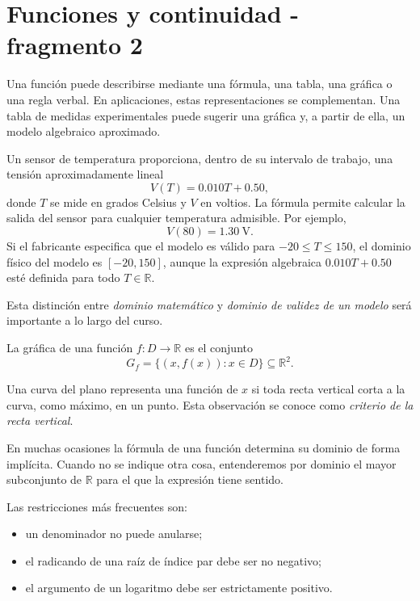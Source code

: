 \section{Funciones y continuidad - fragmento 2}
Una función puede describirse mediante una fórmula, una tabla, una gráfica o una regla verbal. En aplicaciones, estas representaciones se complementan. Una tabla de medidas experimentales puede sugerir una gráfica y, a partir de ella, un modelo algebraico aproximado.

\begin{example}
Un sensor de temperatura proporciona, dentro de su intervalo de trabajo, una tensión aproximadamente lineal
\[
V(T)=0.010T+0.50,
\]
donde $T$ se mide en grados Celsius y $V$ en voltios. La fórmula permite calcular la salida del sensor para cualquier temperatura admisible. Por ejemplo,
\[
V(80)=1.30\ \mathrm{V}.
\]
Si el fabricante especifica que el modelo es válido para $-20\leq T\leq150$, el dominio físico del modelo es $[-20,150]$, aunque la expresión algebraica $0.010T+0.50$ esté definida para todo $T\in\mathbb{R}$.
\end{example}

Esta distinción entre \emph{dominio matemático} y \emph{dominio de validez de un modelo} será importante a lo largo del curso.

\begin{definition}
La gráfica de una función $f:D\to\mathbb{R}$ es el conjunto
\[
G_f=\{(x,f(x)):x\in D\}\subseteq\mathbb{R}^2.
\]
\end{definition}

Una curva del plano representa una función de $x$ si toda recta vertical corta a la curva, como máximo, en un punto. Esta observación se conoce como \emph{criterio de la recta vertical}.

En muchas ocasiones la fórmula de una función determina su dominio de forma implícita. Cuando no se indique otra cosa, entenderemos por dominio el mayor subconjunto de $\mathbb{R}$ para el que la expresión tiene sentido.

Las restricciones más frecuentes son:
\begin{itemize}
\item un denominador no puede anularse;
\item el radicando de una raíz de índice par debe ser no negativo;
\item el argumento de un logaritmo debe ser estrictamente positivo.
\end{itemize}


